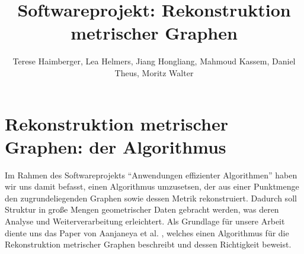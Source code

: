 \documentclass[parskip=half,
 fontsize=12pt, bibtotoc,
 ngerman]
 {article}
\author{Terese Haimberger, Lea Helmers, Jiang Hongliang, Mahmoud Kassem, Daniel Theus, Moritz Walter}
\title{Softwareprojekt: Rekonstruktion metrischer Graphen}
\date{}
\begin{document}
\maketitle
\onehalfspacing
\section{Rekonstruktion metrischer Graphen: der Algorithmus}
Im Rahmen des Softwareprojekts "`Anwendungen effizienter Algorithmen"' haben wir uns damit befasst, einen Algorithmus umzusetsen, der aus einer Punktmenge den zugrundeliegenden Graphen sowie dessen Metrik rekonstruiert. Dadurch soll Struktur in gro{\ss}e Mengen geometrischer Daten gebracht werden, was deren Analyse und Weiterverarbeitung erleichtert. Als Grundlage für unsere Arbeit diente uns das Paper von Aanjaneya et al. \cite{chenEa2012}, welches einen Algorithmus für die Rekonstruktion metrischer Graphen beschreibt und dessen Richtigkeit beweist.\newline
\printbibliography
\end{document}
